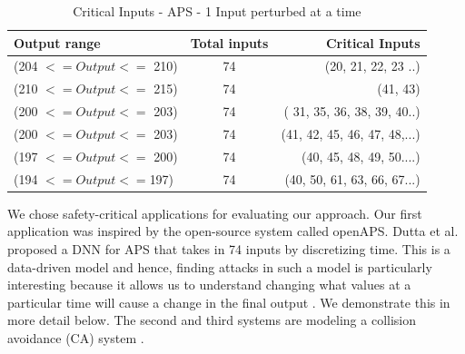 \begin{table}[h!]
	\begin{center}
		\caption{Critical Inputs - APS - 1 Input perturbed at a time}
		\label{tab:table1}
		\begin{tabular}{l|S|r}
			\textbf{Output range} & \textbf{Total inputs} & \textbf{Critical Inputs}  \\
			\hline
			(204 $<= Output <=$ 210) &  74&  (20, 21, 22, 23 ..)\\
			(210 $<= Output <=$ 215) &  74&   (41, 43)\\
			(200 $<= Output <=$ 203) &  74&  ( 31, 35, 36, 38, 39, 40..) \\
			(200 $<= Output <=$ 203) &  74&  (41, 42, 45, 46, 47, 48,...) \\
			(197 $<= Output <=$ 200) &  74&  (40, 45, 48, 49, 50....) \\
			(194 $<= Output <=$197) & 74& (40, 50, 61, 63, 66, 67...)\\
			\hline
			\hline
			
		\end{tabular}
	\end{center}
\end{table}
We chose safety-critical applications for evaluating our approach. Our first application was inspired by the open-source system called openAPS.
Dutta et al. \cite{10.1007/978-3-319-99429-1_11} proposed a DNN for APS that takes in 74 inputs by discretizing time. This is a data-driven model and hence, finding attacks in such a model is particularly interesting because it allows us to understand changing what values at a particular time will cause a change in the final output . We demonstrate this in more detail below. 
The second and third systems are modeling a collision avoidance (CA) system . 
